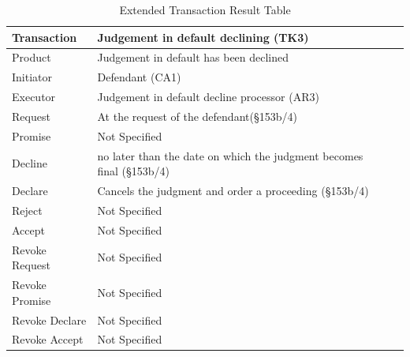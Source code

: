 \begin{landscape}
\begin{table}[h]
\caption{Extended Transaction Result Table}
\label{tab:etrt}
\begin{tabular}{|l||l|l|}
\hline
Transaction  & Judgement in default declining (TK3)  \\ \hline
Product      & Judgement in default has been declined  \\ \hline
Initiator      &  Defendant (CA1)   \\ \hline
Executor       &  Judgement in default decline processor (AR3) \\ \hline
Request        & At the request of the defendant(\S153b/4)   \\ \hline
Promise        &  Not Specified \\ \hline
Decline        &  no later than the date on which the judgment becomes final (\S153b/4) \\ \hline
Declare        & Cancels the judgment and order a proceeding (\S153b/4) \\ \hline
Reject         &  Not Specified   \\ \hline
Accept         & Not Specified \\ \hline
Revoke Request & Not Specified  \\ \hline
Revoke Promise & Not Specified  \\ \hline
Revoke Declare & Not Specified  \\ \hline
Revoke Accept  &  Not Specified  \\ \hline
\end{tabular}
\end{table}


\end{landscape}
